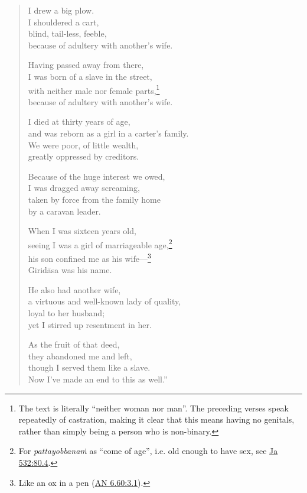 \documentclass[12pt,openany]{book}%
\begin{document}
\begin{verse}
I drew a big plow. \\
I shouldered a cart, \\
blind, tail-less, feeble, \\
because of adultery with another’s wife. 

Having passed away from there, \\
I was born of a slave in the street, \\
with neither male nor female parts,\footnote{The text is literally “neither woman nor man”. The preceding verses speak repeatedly of castration, making it clear that this means having no genitals, rather than simply being a person who is non-binary. } \\
because of adultery with another’s wife. 

I died at thirty years of age, \\
and was reborn as a girl in a carter’s family. \\
We were poor, of little wealth, \\
greatly oppressed by creditors. 

Because of the huge interest we owed, \\
I was dragged away screaming, \\
taken by force from the family home \\
by a caravan leader. 

When I was sixteen years old, \\
seeing I was a girl of marriageable age,\footnote{For \textit{\textsanskrit{pattayobbanaṁ}} as “come of age”, i.e. old enough to have sex, see \href{https://suttacentral.net/ja532/en/sujato\#80.4}{Ja 532:80.4}. } \\
his son confined me as his wife—\footnote{Like an ox in a pen (\href{https://suttacentral.net/an6.60/en/sujato\#3.1}{AN 6.60:3.1}). } \\
\textsanskrit{Giridāsa} was his name. 

He also had another wife, \\
a virtuous and well-known lady of quality, \\
loyal to her husband; \\
yet I stirred up resentment in her. 

As the fruit of that deed, \\
they abandoned me and left, \\
though I served them like a slave. \\
Now I’ve made an end to this as well.” 

%
\end{verse}
\end{document}
